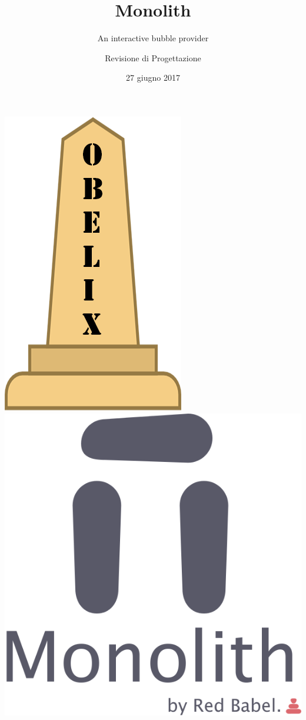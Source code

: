 \documentclass[RawSienna,dvipsnames]{beamer}
\title{Monolith}
\subtitle{An interactive bubble provider}
\author{Revisione di Progettazione}
\date{27 giugno 2017}
\begin{document}
	
\begin{frame}
	\begin{center}
		\includegraphics[scale=0.13]{img/obelix.png}
		\qquad\qquad
		\includegraphics[scale=0.13]{img/monolith.png}
	\end{center}
	\titlepage
\end{frame}


\section[Sommario]{}
\begin{frame}
	\tableofcontents
\end{frame}	





\end{document}
